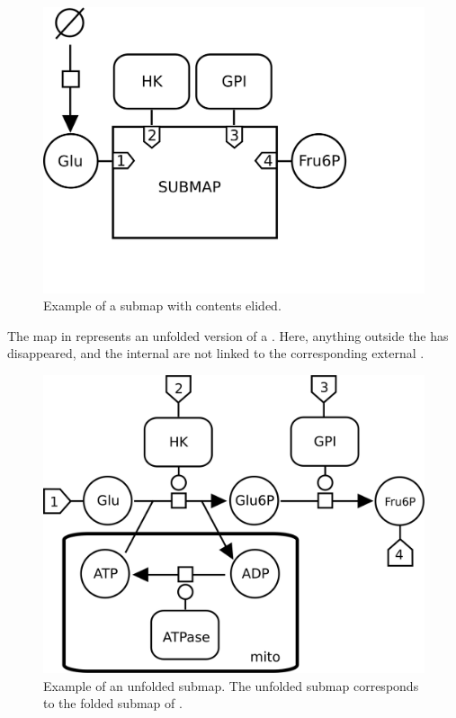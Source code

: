 \begin{figure}[htb]
  \centering
  \includegraphics[scale = 0.4]{examples/submap-folded}
  \caption{Example of a submap with contents elided.}
  \label{fig:submap-folded}
\end{figure}

The map in  represents an unfolded version of a
.  Here, anything outside the  has
disappeared, and the internal  are not linked to the
corresponding external .

\begin{figure}[htb]
  \centering
  \includegraphics[scale = 0.35]{examples/submap-dissociated}
  \caption{Example of an unfolded submap. The unfolded submap corresponds to the folded submap of .}
  \label{fig:submap-unfolded}
\end{figure}

